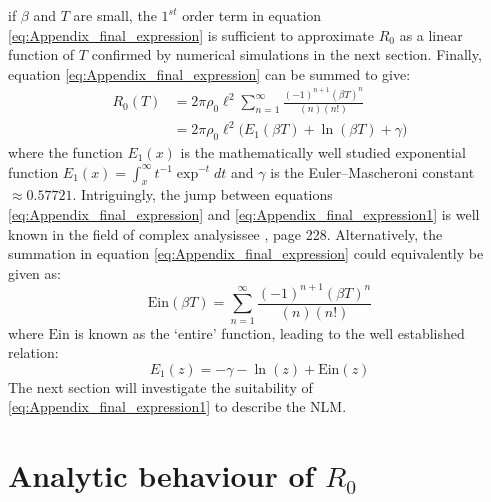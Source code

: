if $\beta$ and $T$ are small, the $1^{st}$ order term in equation \ref{eq:Appendix_final_expression} is sufficient to approximate $R_0$ as a linear function of $T$\textemdash
confirmed by numerical simulations in the next section. 
Finally, equation \ref{eq:Appendix_final_expression} can be summed to give:
\begin{equation} 
\label{eq:Appendix_final_expression1}
\begin{split}
R_0(T) & = 2\pi\rho_0 \ell^2 \sum^{\infty}_{n=1} \frac{(-1)^{n+1} (\beta T)^n}{(n)(n!)}\\
& =  2\pi\rho_0 \ell^2 \big(E_1(\beta T) + \ln (\beta T) + \gamma\big)
\end{split}
\end{equation}
where the function $E_1(x)$ is the mathematically well studied exponential function $E_1(x)=\int^{\infty}_x t^{-1}\exp^{-t}dt$ and $\gamma$ is the Euler–Mascheroni constant $\approx 0.57721$.
Intriguingly, the jump between equations \ref{eq:Appendix_final_expression} and \ref{eq:Appendix_final_expression1} is well known in the field of complex analysis\textemdash see \cite{abramowitz1948handbook}, page 228.
Alternatively, the summation in equation \ref{eq:Appendix_final_expression} could equivalently be given as:
\begin{equation}
\label{eq:ein}
     \mathrm{Ein}(\beta T) = \sum^{\infty}_{n=1} \frac{(-1)^{n+1} (\beta T)^n}{(n)(n!)}
\end{equation}
where $\mathrm{Ein}$ is known as the `entire' function, leading to the well established relation:
\[
E_1(z) = -\gamma - \ln(z) + \mathrm{Ein}(z)
\]
The next section will investigate the suitability of \ref{eq:Appendix_final_expression1} to describe the NLM.

\section{Analytic behaviour of $R_0$}

